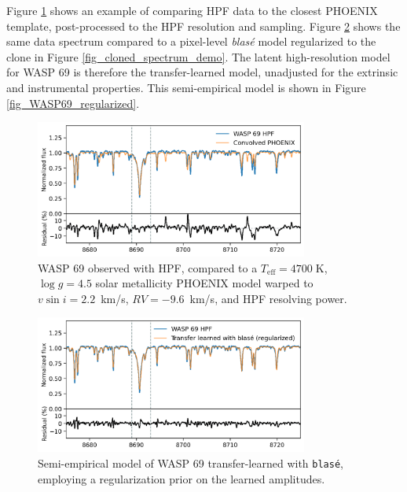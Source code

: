 \documentclass[modern]{aastex631}
\begin{document}
Figure \ref{fig_WASP69_demo} shows an example of comparing HPF data to the closest PHOENIX template, post-processed to the HPF resolution and sampling.  Figure \ref{fig_WASP69_transferred} shows the same data spectrum compared to a pixel-level \emph{blas\'e} model regularized to the clone in Figure \ref{fig_cloned_spectrum_demo}.  The latent high-resolution model for WASP 69 is therefore the transfer-learned model, unadjusted for the extrinsic and instrumental properties.  This semi-empirical model is shown in Figure \ref{fig_WASP69_regularized}.


\begin{figure}[hbt!]
    \centering
    \includegraphics[width=0.8\textwidth]{figures/blase_WASP69_demo.png}
    \caption{WASP 69 observed with HPF, compared to a $T_{\mathrm{eff}}=4700\;$K,  $\log{g}=4.5$ solar metallicity PHOENIX model warped to $v\sin{i}=2.2$~km/s, $RV=-9.6$~km/s, and HPF resolving power.}
    \label{fig_WASP69_demo}
\end{figure}

\begin{figure}[hbt!]
    \centering
    \includegraphics[width=0.8\textwidth]{figures/blase_WASP69_regularized.png}
    \caption{Semi-empirical model of WASP 69 transfer-learned with \texttt{blas\'e}, employing a regularization prior on the learned amplitudes.}
    \label{fig_WASP69_transferred}
\end{figure}
\end{document}
